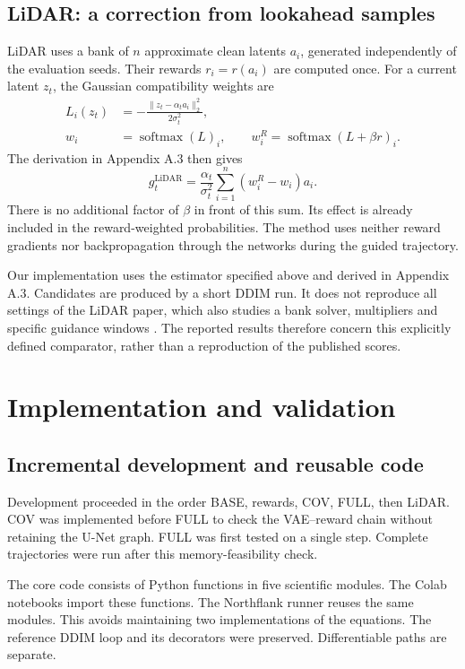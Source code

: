 \documentclass[11pt,a4paper]{article}
\newcommand{\softmax}{\operatorname{softmax}}
\newcommand{\code}[1]{\texttt{\detokenize{#1}}}
\begin{document}
\subsection{LiDAR: a correction from lookahead samples}
LiDAR uses a bank of $n$ approximate clean latents $a_i$, generated independently of the evaluation seeds. Their rewards $r_i=r(a_i)$ are computed once. For a current latent $z_t$, the Gaussian compatibility weights are
\begin{align}
L_i(z_t)&=-\frac{\lVert z_t-\alpha_ta_i\rVert_2^2}{2\sigma_t^2},\\
w_i&=\softmax(L)_i,\qquad
w_i^R=\softmax(L+\beta r)_i.
\end{align}
The derivation in Appendix A.3 then gives
\begin{equation}\label{eq:lidar}
g_t^{\mathrm{LiDAR}}=\frac{\alpha_t}{\sigma_t^2}
\sum_{i=1}^{n}(w_i^R-w_i)a_i.
\end{equation}
There is no additional factor of $\beta$ in front of this sum. Its effect is already included in the reward-weighted probabilities. The method uses neither reward gradients nor backpropagation through the networks during the guided trajectory.

Our implementation uses the estimator specified above and derived in Appendix A.3. Candidates are produced by a short DDIM run. It does not reproduce all settings of the LiDAR paper, which also studies a bank solver, multipliers and specific guidance windows \cite{lidar}. The reported results therefore concern this explicitly defined comparator, rather than a reproduction of the published scores.

\section{Implementation and validation}
\subsection{Incremental development and reusable code}
Development proceeded in the order BASE, rewards, COV, FULL, then LiDAR. COV was implemented before FULL to check the VAE--reward chain without retaining the U-Net graph. FULL was first tested on a single step. Complete trajectories were run after this memory-feasibility check.

The core code consists of Python functions in five scientific modules. The Colab notebooks import these functions. The Northflank runner reuses the same modules. This avoids maintaining two implementations of the equations. The reference DDIM loop and its \code{no_grad} decorators were preserved. Differentiable paths are separate.
\end{document}

